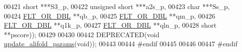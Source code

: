 \begin{DoxyCode}
00421                      \textcolor{keywordtype}{short} ***S3\_p,
00422                      \textcolor{keywordtype}{unsigned} \textcolor{keywordtype}{short} ***a2s\_p,
00423                      \textcolor{keywordtype}{char} ***Ss\_p,
00424                      \hyperlink{group__data__structures_ga31125aeace516926bf7f251f759b6126}{FLT\_OR\_DBL} **qb\_p,
00425                      \hyperlink{group__data__structures_ga31125aeace516926bf7f251f759b6126}{FLT\_OR\_DBL} **qm\_p,
00426                      \hyperlink{group__data__structures_ga31125aeace516926bf7f251f759b6126}{FLT\_OR\_DBL} **q1k\_p,
00427                      \hyperlink{group__data__structures_ga31125aeace516926bf7f251f759b6126}{FLT\_OR\_DBL} **qln\_p,
00428                      \textcolor{keywordtype}{short} **pscore));
00429 
00430 
00442 DEPRECATED(\textcolor{keywordtype}{void} \hyperlink{group__consensus__fold_gac484c6bd429bafbd353b91044508d8e9}{update\_alifold\_params}(\textcolor{keywordtype}{void}));
00443 
00444 \textcolor{preprocessor}{#endif}
00445 
00446 
00447 \textcolor{preprocessor}{#endif}
\end{DoxyCode}
